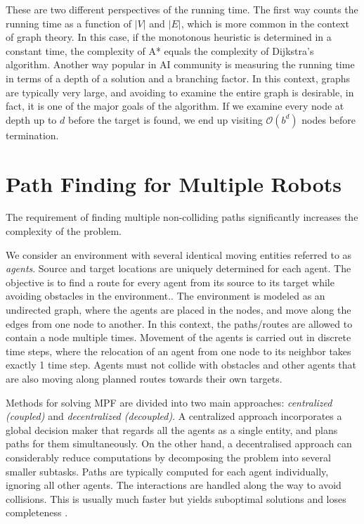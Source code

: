 These are two different perspectives of the running time. 
The first way counts the running time as a function of $|V|$ and $|E|$, which is more common in the context of graph theory.
In this case, if the monotonous heuristic is determined in a constant time, the complexity of A* equals the complexity of Dijkstra's algorithm. 
Another way popular in AI community is measuring the running time in terms of a depth of a solution and a branching factor.
In this context, graphs are typically very large, and avoiding to examine the entire graph is desirable, in fact, it is one of the major goals of the algorithm.
If we examine every node at depth up to $d$ before the target is found, we end up visiting $\mathcal{O}(b^d)$ nodes before termination.
\section{Path Finding for Multiple Robots}

The requirement of finding multiple non-colliding paths significantly increases the complexity of the problem.

We consider an environment with several identical moving entities referred to as \emph{agents}. 
Source and target locations are uniquely determined for each agent. 
The objective is to find a route for every agent from its source to its target while avoiding obstacles in the environment..
The environment is modeled as an undirected graph, where the agents are placed in the nodes, and move along the edges from one node to another. 
In this context, the paths/routes are allowed to contain a node multiple times.
Movement of the agents is carried out in discrete time steps, where the relocation of an agent from one node to its neighbor takes exactly 1 time step.
Agents must not collide with obstacles and other agents that are also moving along planned routes towards their own targets.

Methods for solving MPF are divided into two main approaches: \emph{centralized (coupled)} and \emph{decentralized (decoupled)}.
A centralized approach incorporates a global decision maker that regards all the agents as a single entity, and plans paths for them simultaneously.
On the other hand, a decentralised approach can considerably reduce computations by decomposing the problem into several smaller subtasks.
Paths are typically computed for each agent individually, ignoring all other agents.
The interactions are handled along the way to avoid collisions.
This is usually much faster but yields suboptimal solutions and loses completeness \cite{ryan08}.

